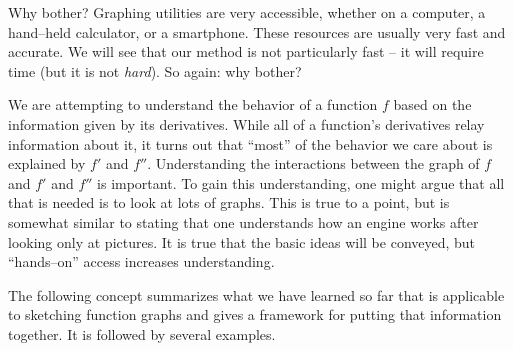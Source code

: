 Why bother? Graphing utilities are very accessible, whether on a computer, a hand--held calculator, or a smartphone. These resources are usually very fast and accurate. We will see that our method is not particularly fast -- it will require time (but it is not \textit{hard}). So again: why bother?

We are attempting to understand the behavior of a function $f$ based on the information given by its derivatives. While all of a function's derivatives relay information about it, it turns out that ``most'' of the behavior we care about is explained by $f'$ and $f''$. Understanding the interactions between the graph of $f$ and $f'$ and $f''$ is important. To gain this understanding, one might argue that all that is needed is to look at lots of graphs. This is true to a point, but is somewhat similar to stating that one understands how an engine works after looking only at pictures. It is true that the basic ideas will be conveyed, but ``hands--on'' access increases understanding.

The following concept summarizes what we have learned so far that is applicable to sketching function graphs and gives a framework for putting that information together. It is followed by several examples.

